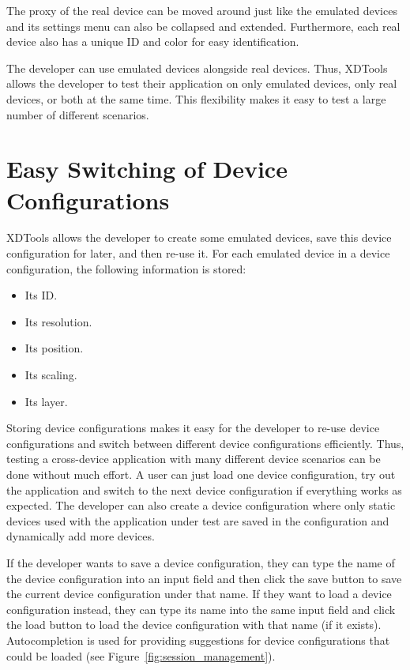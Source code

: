 The proxy of the real device can be moved around just like the emulated devices and its settings menu can also be collapsed and extended. Furthermore, each real device also has a unique ID and color for easy identification.

The developer can use emulated devices alongside real devices. Thus, XDTools allows the developer to test their application on only emulated devices, only real devices, or both at the same time. This flexibility makes it easy to test a large number of different scenarios.

\section{Easy Switching of Device Configurations}

XDTools allows the developer to create some emulated devices, save this device configuration for later, and then re-use it. For each emulated device in a device configuration, the following information is stored:
\begin{itemize}
	\item Its ID.
	\item Its resolution.
	\item Its position.
	\item Its scaling.
	\item Its layer.
\end{itemize}
Storing device configurations makes it easy for the developer to re-use device configurations and switch between different device configurations efficiently. Thus, testing a cross-device application with many different device scenarios can be done without much effort. A user can just load one device configuration, try out the application and switch to the next device configuration if everything works as expected. The developer can also create a device configuration where only static devices used with the application under test are saved in the configuration and dynamically add more devices.

If the developer wants to save a device configuration, they can type the name of the device configuration into an input field and then click the save button to save the current device configuration under that name. If they want to load a device configuration instead, they can type its name into the same input field and click the load button to load the device configuration with that name (if it exists). Autocompletion is used for providing suggestions for device configurations that could be loaded (see Figure~\ref{fig:session_management}). 

